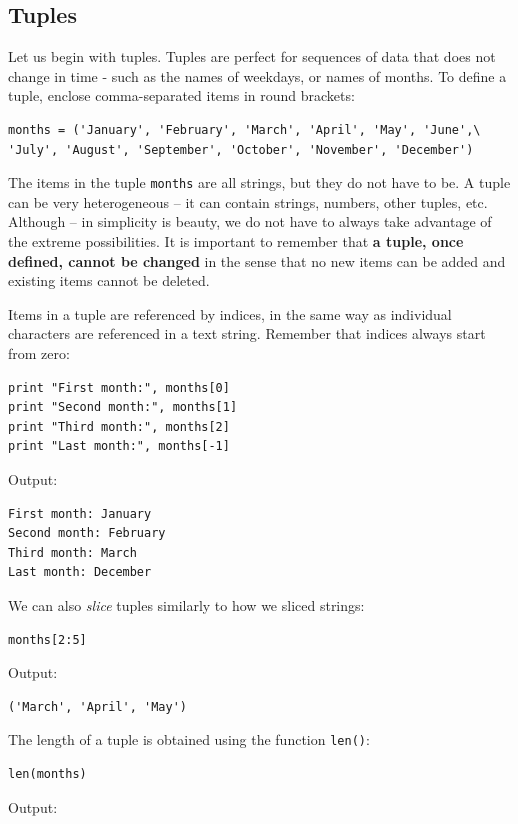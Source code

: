 \subsection{Tuples}

Let us begin with tuples. Tuples are perfect for sequences 
of data that does not change in time - such as 
the names of weekdays, or names of months. To define a tuple, 
enclose comma-separated items in round brackets:

\begin{verbatim}
months = ('January', 'February', 'March', 'April', 'May', 'June',\
'July', 'August', 'September', 'October', 'November', 'December')
\end{verbatim}
The items in the tuple {\tt months} are all strings, but they do not
have to be. A tuple can be very heterogeneous -- it can contain strings,
numbers, other tuples, etc. Although -- in simplicity is beauty, we
do not have to always take advantage of the extreme possibilities.
It is important to remember that {\bf a tuple, once defined, cannot 
be changed} in the sense that no new items can be added and existing 
items cannot be deleted.

Items in a tuple are referenced by indices, in the same way as individual 
characters are referenced in a text string. Remember that indices always 
start from zero:

\begin{verbatim}
print "First month:", months[0]
print "Second month:", months[1]
print "Third month:", months[2]
print "Last month:", months[-1]
\end{verbatim}
Output:

\begin{verbatim}
First month: January
Second month: February
Third month: March
Last month: December
\end{verbatim}
We can also {\em slice} tuples similarly to how we sliced strings:

\begin{verbatim}
months[2:5]
\end{verbatim}
Output:

\begin{verbatim}
('March', 'April', 'May')
\end{verbatim}
The length of a tuple is obtained using the function {\tt len()}:

\begin{verbatim}
len(months)
\end{verbatim}
Output:

